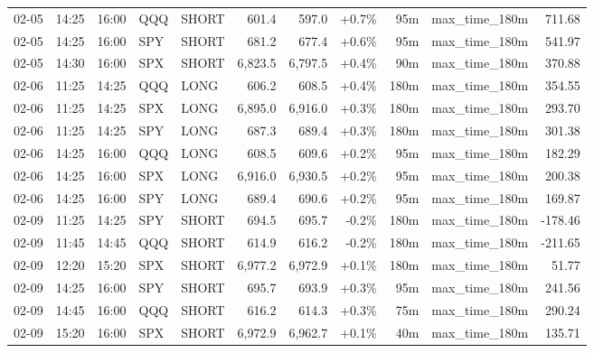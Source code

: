 \documentclass[11pt,a4paper,twoside]{article}
\begin{document}
\begin{center}
\begin{longtable}{>{\color{txtmain}}l l l l l r r r r >{\color{txtmain}}l r}
02-05 & 14:25 & 16:00 & QQQ & SHORT & 601.4 & 597.0 & \textcolor{wingreen}{+0.7\%} & 95m & max\_time\_180m & \textcolor{wingreen}{711.68} \\
02-05 & 14:25 & 16:00 & SPY & SHORT & 681.2 & 677.4 & \textcolor{wingreen}{+0.6\%} & 95m & max\_time\_180m & \textcolor{wingreen}{541.97} \\
02-05 & 14:30 & 16:00 & SPX & SHORT & 6,823.5 & 6,797.5 & \textcolor{wingreen}{+0.4\%} & 90m & max\_time\_180m & \textcolor{wingreen}{370.88} \\
02-06 & 11:25 & 14:25 & QQQ & LONG & 606.2 & 608.5 & \textcolor{wingreen}{+0.4\%} & 180m & max\_time\_180m & \textcolor{wingreen}{354.55} \\
02-06 & 11:25 & 14:25 & SPX & LONG & 6,895.0 & 6,916.0 & \textcolor{wingreen}{+0.3\%} & 180m & max\_time\_180m & \textcolor{wingreen}{293.70} \\
02-06 & 11:25 & 14:25 & SPY & LONG & 687.3 & 689.4 & \textcolor{wingreen}{+0.3\%} & 180m & max\_time\_180m & \textcolor{wingreen}{301.38} \\
02-06 & 14:25 & 16:00 & QQQ & LONG & 608.5 & 609.6 & \textcolor{wingreen}{+0.2\%} & 95m & max\_time\_180m & \textcolor{wingreen}{182.29} \\
02-06 & 14:25 & 16:00 & SPX & LONG & 6,916.0 & 6,930.5 & \textcolor{wingreen}{+0.2\%} & 95m & max\_time\_180m & \textcolor{wingreen}{200.38} \\
02-06 & 14:25 & 16:00 & SPY & LONG & 689.4 & 690.6 & \textcolor{wingreen}{+0.2\%} & 95m & max\_time\_180m & \textcolor{wingreen}{169.87} \\
02-09 & 11:25 & 14:25 & SPY & SHORT & 694.5 & 695.7 & \textcolor{lossred}{-0.2\%} & 180m & max\_time\_180m & \textcolor{lossred}{-178.46} \\
02-09 & 11:45 & 14:45 & QQQ & SHORT & 614.9 & 616.2 & \textcolor{lossred}{-0.2\%} & 180m & max\_time\_180m & \textcolor{lossred}{-211.65} \\
02-09 & 12:20 & 15:20 & SPX & SHORT & 6,977.2 & 6,972.9 & \textcolor{wingreen}{+0.1\%} & 180m & max\_time\_180m & \textcolor{wingreen}{51.77} \\
02-09 & 14:25 & 16:00 & SPY & SHORT & 695.7 & 693.9 & \textcolor{wingreen}{+0.3\%} & 95m & max\_time\_180m & \textcolor{wingreen}{241.56} \\
02-09 & 14:45 & 16:00 & QQQ & SHORT & 616.2 & 614.3 & \textcolor{wingreen}{+0.3\%} & 75m & max\_time\_180m & \textcolor{wingreen}{290.24} \\
02-09 & 15:20 & 16:00 & SPX & SHORT & 6,972.9 & 6,962.7 & \textcolor{wingreen}{+0.1\%} & 40m & max\_time\_180m & \textcolor{wingreen}{135.71} \\

\end{longtable}
\end{center}
\end{document}
